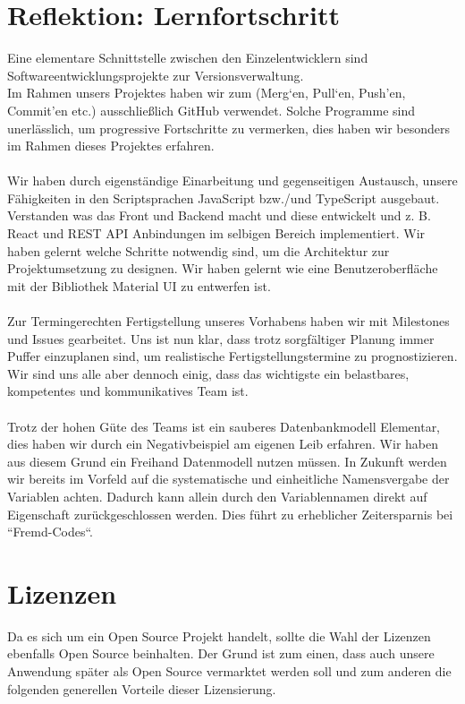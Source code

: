 \section{Reflektion: Lernfortschritt}
Eine elementare Schnittstelle zwischen den Einzelentwicklern sind Softwareentwicklungsprojekte zur Versionsverwaltung.\\ 
Im Rahmen unsers Projektes haben wir zum (Merg‘en, Pull‘en, Push’en, Commit’en etc.) ausschließlich GitHub verwendet. 
Solche Programme sind unerlässlich, um progressive Fortschritte zu vermerken, dies haben wir besonders im Rahmen dieses Projektes erfahren.\\\\ 
Wir haben durch eigenständige Einarbeitung und gegenseitigen Austausch, unsere Fähigkeiten in den Scriptsprachen JavaScript bzw./und TypeScript ausgebaut. 
Verstanden was das Front und Backend macht und diese entwickelt und z. B. React und REST API Anbindungen im selbigen Bereich implementiert. 
Wir haben gelernt welche Schritte notwendig sind, um die Architektur zur Projektumsetzung zu designen.
Wir haben gelernt wie eine Benutzeroberfläche mit der Bibliothek Material UI zu entwerfen ist.\\\\ 
Zur Termingerechten Fertigstellung unseres Vorhabens haben wir mit Milestones und Issues gearbeitet. 
Uns ist nun klar, dass trotz sorgfältiger Planung immer Puffer einzuplanen sind, um realistische Fertigstellungstermine zu prognostizieren. 
Wir sind uns alle aber dennoch einig, dass das wichtigste ein belastbares, kompetentes und kommunikatives Team ist.\\\\  
Trotz der hohen Güte des Teams ist ein sauberes Datenbankmodell Elementar, dies haben wir durch ein Negativbeispiel am eigenen Leib erfahren.
Wir haben aus diesem Grund ein Freihand Datenmodell nutzen müssen.
In Zukunft werden wir bereits im Vorfeld auf die systematische und einheitliche Namensvergabe der Variablen achten. 
Dadurch kann allein durch den Variablennamen direkt auf Eigenschaft zurückgeschlossen werden.
Dies führt zu erheblicher Zeitersparnis bei “Fremd-Codes“.


\section{Lizenzen}
Da es sich um ein Open Source Projekt handelt, sollte die Wahl der Lizenzen ebenfalls Open Source beinhalten.
Der Grund ist zum einen, dass auch unsere Anwendung später als Open Source vermarktet werden soll und zum anderen die folgenden generellen Vorteile dieser Lizensierung.

